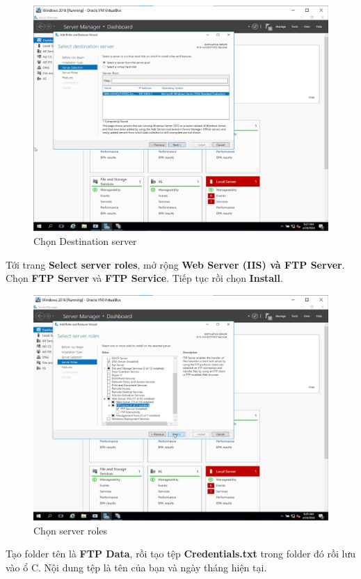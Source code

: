 \begin{figure}[!htb]
    \centering
    \includegraphics[width=0.8\linewidth]{figure//chapter9//lab9_2/destination-server.png}
    \caption{Chọn Destination server}
    \label{fig:enter-label}
\end{figure}

 Tới trang \textbf{Select server roles}, mở rộng \textbf{Web Server (IIS) và FTP Server}. Chọn \textbf{FTP Server} và \textbf{FTP Service}. Tiếp tục rồi chọn \textbf{Install}.

\begin{figure}[!htb]
    \centering
    \includegraphics[width=0.8\linewidth]{figure//chapter9//lab9_2/select-role.png}
    \caption{Chọn server roles}
    \label{fig:enter-label}
\end{figure}

 Tạo folder tên là \textbf{FTP Data}, rồi tạo tệp \textbf{Credentials.txt} trong folder đó rồi lưu vào ổ C. Nội dung tệp là tên của bạn và ngày tháng hiện tại.

